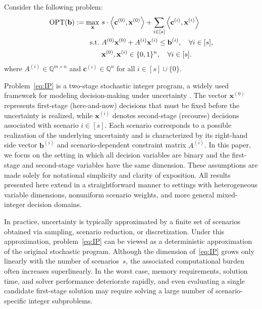 \documentclass{article}
\newcommand{\cv}[0]{\mathbf{c}}
\newcommand{\xv}[0]{\mathbf{x}}
\newcommand{\bv}[0]{\mathbf{b}}
\newcommand{\iprod}[2]{\left\langle {#1}, {#2} \right\rangle}
\newcommand{\OPT}{\textup{OPT}}
\begin{document}
Consider the following problem:
\begin{subequations}
\label{eq:IP}
\begin{align}
\OPT(\bv) := \max_{\xv} \ & s \cdot \iprod{\cv^{(0)}}{\xv^{(0)}} + \sum_{i \in [s]} \iprod{\cv^{(i)}}{\xv^{(i)}} \label{eq:obj1} \\
\text{s.t.}\ & A^{(0)} \xv^{(0)} + A^{(i)}\xv^{(i)} \leq \bv^{(i)}, \quad \forall i \in [s], \label{eq:sub}\\
& \xv^{(0)}, \xv^{(i)} \in \{0,1\}^{n}, \quad \forall i \in [s]. \label{eq:origLast}
\end{align}
\end{subequations}
where $A^{(i)} \in \mathbb{Q}^{m \times n}$ and $\cv^{(i)} \in \mathbb{Q}^{n}$ for all
$i \in [s] \cup \{0\}$.

Problem~\eqref{eq:IP} is a two-stage stochastic integer program, a widely used
framework for modeling decision-making under uncertainty \cite{kuccukyavuz2017introduction,liu2016decomposition,romeijndersastochastic,sahinidis2004optimization}.
The vector $\xv^{(0)}$ represents first-stage (here-and-now) decisions that must be
fixed before the uncertainty is realized, while $\xv^{(i)}$ denotes second-stage
(recourse) decisions associated with scenario $i \in [s]$.
Each scenario corresponds to a possible realization of the underlying uncertainty
and is characterized by its right-hand side vector $\bv^{(i)}$ and
scenario-dependent constraint matrix $A^{(i)}$.
In this paper, we focus on the setting in which all decision variables are binary
and the first-stage and second-stage variables have the same dimension.
These assumptions are made solely for notational simplicity and clarity of
exposition.
All results presented here extend in a straightforward manner to settings with
heterogeneous variable dimensions, nonuniform scenario weights, and more general
mixed-integer decision domains.

In practice, uncertainty is typically approximated by a finite set of scenarios
obtained via sampling, scenario reduction, or discretization.
Under this approximation, problem~\eqref{eq:IP} can be viewed as a deterministic
approximation of the original stochastic program.
Although the dimension of~\eqref{eq:IP} grows only linearly with the number of
scenarios~$s$, the associated computational burden often increases superlinearly.
In the worst case, memory requirements, solution time, and solver performance
deteriorate rapidly, and even evaluating a single candidate first-stage solution
may require solving a large number of scenario-specific integer subproblems.
\end{document}
